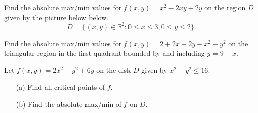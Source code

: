 \clearpage
\begin{example}
    Find the absolute max/min values for $f(x,y) =x^2-2xy+2y$ on the region $D$ given by the picture below below.
    \begin{equation*}
        D = \{(x,y)\in \mathbb{R}^2: 0\leq x\leq 3, 0\leq y\leq 2\}.
    \end{equation*}
\end{example}

\clearpage

\begin{example}
    Find the absolute max/min values for $f(x,y) =2+2x+2y-x^2-y^2$ on the triangular region in the first quadrant bounded by and including $y=9-x$.
\end{example}


\clearpage
\begin{example} Let $f(x,y)=2x^2-y^2+6y$ on the disk $D$ given by $x^2+y^2\leq 16$.
    \begin{itemize}
        \item[(a)] Find all critical points of $f$.
        \item[(b)] Find the absolute max/min of $f$ on $D$. 
    \end{itemize}
\end{example}